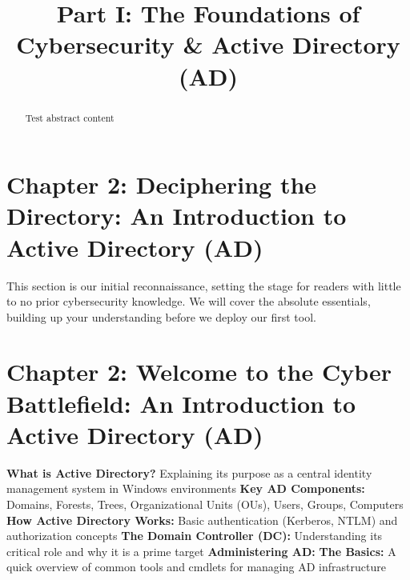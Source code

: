 \documentclass{article}
\title{Part I: The Foundations of Cybersecurity \& Active Directory (AD)}
\begin{document}
\maketitle

\begin{abstract}
Test abstract content
\end{abstract}

\section{Chapter 2: Deciphering the Directory: An Introduction to Active Directory (AD)}
This section is our initial reconnaissance, setting the stage for readers with little to no prior cybersecurity knowledge. We will cover the absolute essentials, building up your understanding before we deploy our first tool.

\section{Chapter 2: Welcome to the Cyber Battlefield: An Introduction to Active Directory (AD)}
    \textbf{What is Active Directory? }Explaining its purpose as a central identity management system in Windows environments
    \textbf{Key AD Components: }Domains, Forests, Trees, Organizational Units (OUs), Users, Groups, Computers
    \textbf{How Active Directory Works: }Basic authentication (Kerberos, NTLM) and authorization concepts
    \textbf{The Domain Controller (DC): }Understanding its critical role and why it is a prime target
    \textbf{Administering AD: }\textbf{The Basics: }A quick overview of common tools and cmdlets for managing AD infrastructure
\end{document}
